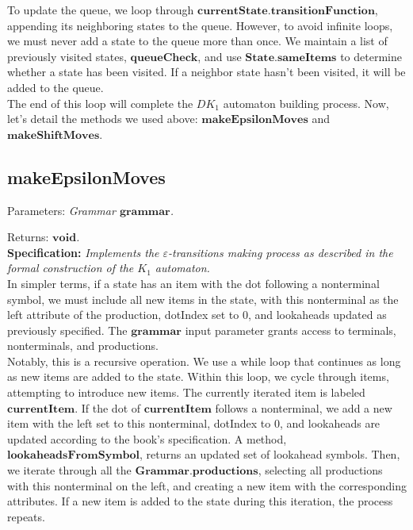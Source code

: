 To update the queue, we loop through \(\boldsymbol{currentState.transitionFunction}\), appending its neighboring states to the queue. However, to avoid infinite loops, we must never add a state to the queue more than once. We maintain a list of previously visited states, \(\boldsymbol{queueCheck}\), and use \(\boldsymbol{State.sameItems}\) to determine whether a state has been visited. If a neighbor state hasn't been visited, it will be added to the queue.\\

The end of this loop will complete the \(DK_{1}\) automaton building process. Now, let's detail the methods we used above: \(\boldsymbol{makeEpsilonMoves}\) and \(\boldsymbol{makeShiftMoves}\).

\vspace{20pt}

\subsection{makeEpsilonMoves}

Parameters: \textit{Grammar \(\boldsymbol{grammar}\).}

Returns: \textit{\(\boldsymbol{void}\).}\\

\textbf{Specification:} \textit{Implements the \(\varepsilon\)-transitions making process as described in the formal construction of the \({K_{1}}\) automaton.}\\

In simpler terms, if a state has an item with the dot following a nonterminal symbol, we must include all new items in the state, with this nonterminal as the left attribute of the production, dotIndex set to 0, and lookaheads updated as previously specified. The \(\boldsymbol{grammar}\) input parameter grants access to terminals, nonterminals, and productions.\\

Notably, this is a recursive operation. We use a while loop that continues as long as new items are added to the state. Within this loop, we cycle through items, attempting to introduce new items. The currently iterated item is labeled  \(\boldsymbol{currentItem}\). If the dot of \(\boldsymbol{currentItem}\) follows a nonterminal, we add a new item with the left set to this nonterminal, dotIndex to 0, and lookaheads are updated according to the book's specification. A method, \(\boldsymbol{lookaheadsFromSymbol}\), returns an updated set of lookahead symbols. Then, we iterate through all the \(\boldsymbol{Grammar.productions}\), selecting all productions with this nonterminal on the left, and creating a new item with the corresponding attributes. If a new item is added to the state during this iteration, the process repeats.\\

